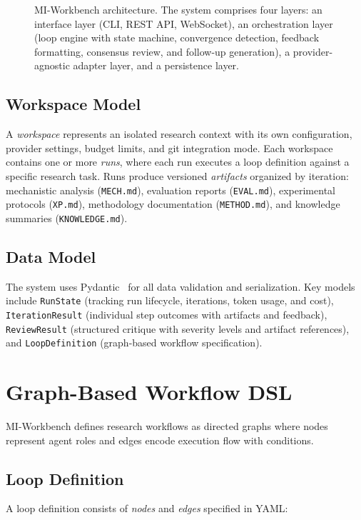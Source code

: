 \documentclass[11pt,a4paper]{article}
\begin{document}
\begin{figure}[t]
\begin{tikzpicture}
\end{tikzpicture}
\caption{MI-Workbench architecture. The system comprises four layers: an interface layer (CLI, REST API, WebSocket), an orchestration layer (loop engine with state machine, convergence detection, feedback formatting, consensus review, and follow-up generation), a provider-agnostic adapter layer, and a persistence layer.}
\label{fig:architecture}
\end{figure}

\subsection{Workspace Model}
A \emph{workspace} represents an isolated research context with its own configuration, provider settings, budget limits, and git integration mode.
Each workspace contains one or more \emph{runs}, where each run executes a loop definition against a specific research task.
Runs produce versioned \emph{artifacts} organized by iteration: mechanistic analysis (\texttt{MECH.md}), evaluation reports (\texttt{EVAL.md}), experimental protocols (\texttt{XP.md}), methodology documentation (\texttt{METHOD.md}), and knowledge summaries (\texttt{KNOWLEDGE.md}).

\subsection{Data Model}
The system uses Pydantic~\citep{pydantic} for all data validation and serialization.
Key models include \texttt{RunState} (tracking run lifecycle, iterations, token usage, and cost), \texttt{IterationResult} (individual step outcomes with artifacts and feedback), \texttt{ReviewResult} (structured critique with severity levels and artifact references), and \texttt{LoopDefinition} (graph-based workflow specification).


\section{Graph-Based Workflow DSL}
\label{sec:dsl}

MI-Workbench defines research workflows as directed graphs where nodes represent agent roles and edges encode execution flow with conditions.

\subsection{Loop Definition}
A loop definition consists of \emph{nodes} and \emph{edges} specified in YAML:
\end{document}
